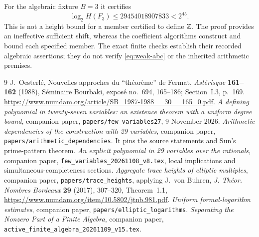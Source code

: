 \documentclass[11pt,a4paper]{article}
\begin{document}
For the algebraic fixture $B=3$ it certifies
\[
 \log_2 H(F_3)\le29454018907833<2^{45}.
\]
This is not a height bound for a member certified to define $\mathbb Z$.
The proof provides an ineffective sufficient shift, whereas the
coefficient algorithms construct and bound each specified member.
The exact finite checks establish their recorded algebraic assertions;
they do not verify \eqref{eq:weak-abc} or the inherited arithmetic premises.

\begin{thebibliography}{9}
J.~Oesterl\'e, Nouvelles approches du ``th\'eor\`eme'' de Fermat,
\emph{Ast\'erisque} \textbf{161--162} (1988), S\'eminaire
Bourbaki, expos\'e no.~694, 165--186; Section~I.3, p.~169.
\url{https://www.numdam.org/article/SB_1987-1988__30__165_0.pdf}.
\emph{A defining polynomial in twenty-seven variables:
an existence theorem with a uniform degree bound},
companion paper, \nolinkurl{papers/few_variables27}, 9 November 2026.
\emph{Arithmetic dependencies of the construction with 29 variables},
companion paper, \nolinkurl{papers/arithmetic_dependencies}.
It pins the source statements and Sun's prime-pattern theorem.
\emph{An explicit polynomial in 29 variables over the rationals},
companion paper, \nolinkurl{few_variables_20261108_v8.tex},
local implications and simultaneous-completeness sections.
\emph{Aggregate trace heights of elliptic multiples}, companion
paper, \nolinkurl{papers/trace_heights}, applying J.~von Buhren,
\emph{J. Th\'eor. Nombres Bordeaux} \textbf{29} (2017), 307--320,
Theorem~1.1, \url{https://www.numdam.org/item/10.5802/jtnb.981.pdf}.
\emph{Uniform formal-logarithm estimates}, companion paper,
\nolinkurl{papers/elliptic_logarithms}.
\emph{Separating the Nonzero Part of a Finite Algebra},
companion paper, \nolinkurl{active_finite_algebra_20261109_v15.tex}.
\end{thebibliography}
\end{document}
